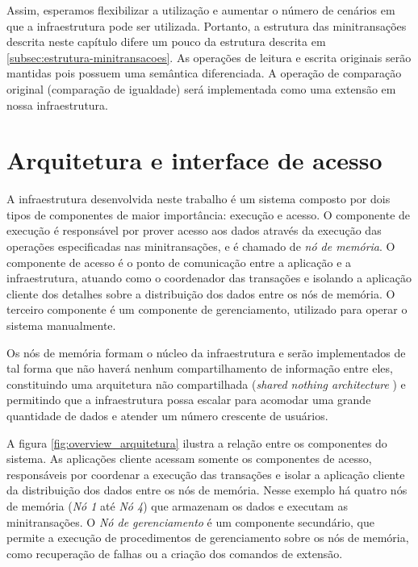 \documentclass[11pt,twoside,a4paper]{book}
\begin{document}
Assim, esperamos flexibilizar a utilização e aumentar o número de cenários em que a infraestrutura pode ser utilizada. Portanto, a estrutura das minitransações descrita neste capítulo difere um pouco da estrutura descrita em \ref{subsec:estrutura-minitransacoes}. As operações de leitura e escrita originais serão mantidas pois possuem uma semântica diferenciada. A operação de comparação original (comparação de igualdade) será implementada como uma extensão em nossa infraestrutura.

\section{Arquitetura e interface de acesso}
\label{sec:arquitetura}

A infraestrutura desenvolvida neste trabalho é um sistema composto por dois tipos de componentes de maior importância: execução e acesso. O componente de execução é responsável por prover acesso aos dados através da execução das operações especificadas nas minitransações, e é chamado de \emph{nó de memória}. O componente de acesso é o ponto de comunicação entre a aplicação e a infraestrutura, atuando como o coordenador das transações e isolando a aplicação cliente dos detalhes sobre a distribuição dos dados entre os nós de memória. O terceiro componente é um componente de gerenciamento, utilizado para operar o sistema manualmente.

Os nós de memória formam o núcleo da infraestrutura e serão implementados de tal forma que não haverá nenhum compartilhamento de informação entre eles, constituindo uma arquitetura não compartilhada (\emph{shared nothing architecture} \cite{shared_nothing}) e permitindo que a infraestrutura possa escalar para acomodar uma grande quantidade de dados e atender um número crescente de usuários.

A figura \ref{fig:overview_arquitetura} ilustra a relação entre os componentes do sistema. As aplicações cliente acessam somente os componentes de acesso, responsáveis por coordenar a execução das transações e isolar a aplicação cliente da distribuição dos dados entre os nós de memória. Nesse exemplo há quatro nós de memória (\emph{Nó 1} até \emph{Nó 4}) que armazenam os dados e executam as minitransações. O \emph{Nó de gerenciamento} é um componente secundário, que permite a execução de procedimentos de gerenciamento sobre os nós de memória, como recuperação de falhas ou a criação dos comandos de extensão.
\end{document}
